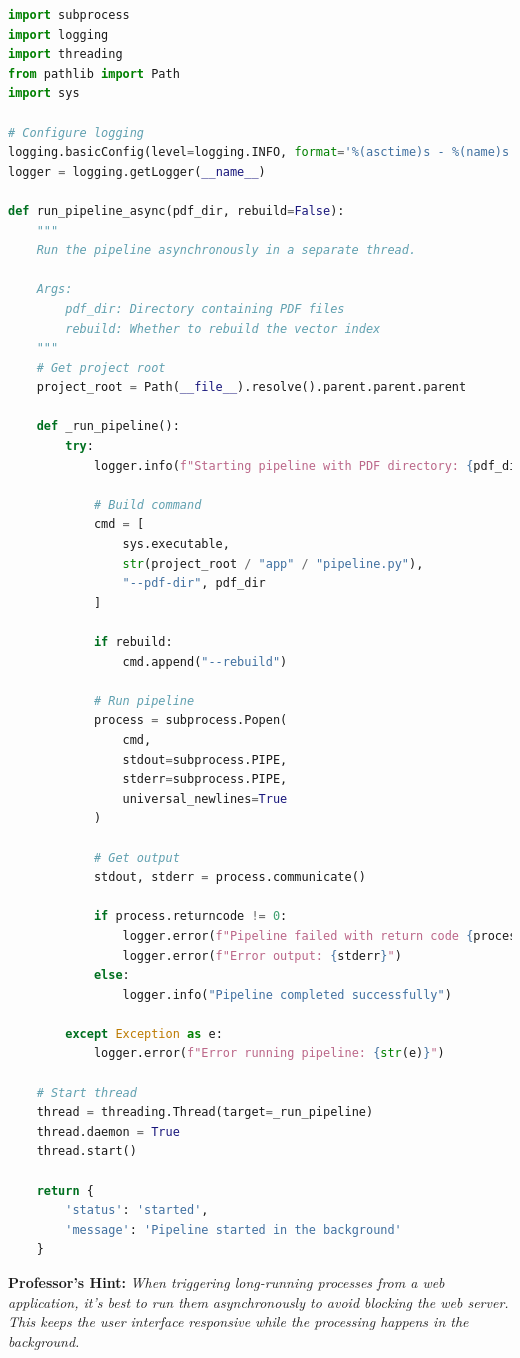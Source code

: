\documentclass[
  screen,review,acmlarge]{acmart}
\begin{document}
\begin{lstlisting}[language=Python]
import subprocess
import logging
import threading
from pathlib import Path
import sys

# Configure logging
logging.basicConfig(level=logging.INFO, format='%(asctime)s - %(name)s - %(levelname)s - %(message)s')
logger = logging.getLogger(__name__)

def run_pipeline_async(pdf_dir, rebuild=False):
    """
    Run the pipeline asynchronously in a separate thread.
    
    Args:
        pdf_dir: Directory containing PDF files
        rebuild: Whether to rebuild the vector index
    """
    # Get project root
    project_root = Path(__file__).resolve().parent.parent.parent

    def _run_pipeline():
        try:
            logger.info(f"Starting pipeline with PDF directory: {pdf_dir}")
            
            # Build command
            cmd = [
                sys.executable,
                str(project_root / "app" / "pipeline.py"),
                "--pdf-dir", pdf_dir
            ]
            
            if rebuild:
                cmd.append("--rebuild")
            
            # Run pipeline
            process = subprocess.Popen(
                cmd,
                stdout=subprocess.PIPE,
                stderr=subprocess.PIPE,
                universal_newlines=True
            )
            
            # Get output
            stdout, stderr = process.communicate()
            
            if process.returncode != 0:
                logger.error(f"Pipeline failed with return code {process.returncode}")
                logger.error(f"Error output: {stderr}")
            else:
                logger.info("Pipeline completed successfully")
                
        except Exception as e:
            logger.error(f"Error running pipeline: {str(e)}")
    
    # Start thread
    thread = threading.Thread(target=_run_pipeline)
    thread.daemon = True
    thread.start()
    
    return {
        'status': 'started',
        'message': 'Pipeline started in the background'
    }
\end{lstlisting}

\textbf{Professor's Hint:} \emph{When triggering long-running processes from a web application, it's best to run them asynchronously to avoid blocking the web server. This keeps the user interface responsive while the processing happens in the background.}
\end{document}
